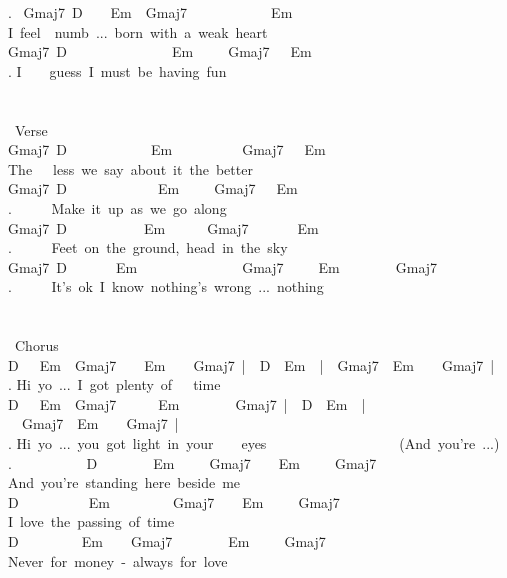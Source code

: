 {. \ Gmaj7\ D\ \ \ \ Em\ \ Gmaj7\ \ \ \ \ \ \ \ \ \ \ \ Em\\
I\ feel\ \ numb\ ...\ born\ with\ a\ weak\ heart\\
Gmaj7\ D\ \ \ \ \ \ \ \ \ \ \ \ \ \ \ Em\ \ \ \ \ Gmaj7\ \ \ Em\\
. I\ \ \ \ guess\ I\ must\ be\ having\ fun\\
\\
\\
\lbrack\ Verse\rbrack\\
Gmaj7\ D\ \ \ \ \ \ \ \ \ \ \ \ Em\ \ \ \ \ \ \ \ \ \ Gmaj7\ \ \ Em\\
The\ \ \ less\ we\ say\ about\ it\ the\ better\\
Gmaj7\ D\ \ \ \ \ \ \ \ \ \ \ \ \ Em\ \ \ \ \ Gmaj7\ \ \ Em\\
. \ \ \ \ \ Make\ it\ up\ as\ we\ go\ along\\
Gmaj7\ D\ \ \ \ \ \ \ \ \ \ \ Em\ \ \ \ \ \ Gmaj7\ \ \ \ \ \ \ Em\\
. \ \ \ \ \ Feet\ on\ the\ ground,\ head\ in\ the\ sky\\
Gmaj7\ D\ \ \ \ \ \ \ Em\ \ \ \ \ \ \ \ \ \ \ \ \ \ \ Gmaj7\ \ \ \ \ Em\ \ \ \ \ \ \ \ Gmaj7\\
. \ \ \ \ \ It's\ ok\ I\ know\ nothing's\ wrong\ ...\ nothing\\
\\
\\
\lbrack\ Chorus\rbrack\\
D\ \ \ Em\ \ Gmaj7\ \ \ \ Em\ \ \ \ Gmaj7\ |\ \ D\ \ Em\ \ |\ \ Gmaj7\ \ Em\ \ \ \ Gmaj7\ |\\
. Hi\ yo\ ...\ I\ got\ plenty\ of\ \ \ time\\
D\ \ \ Em\ \ Gmaj7\ \ \ \ \ \ Em\ \ \ \ \ \ \ \ Gmaj7\ |\ \ D\ \ Em\ \ |\ \ Gmaj7\ \ Em\ \ \ \ Gmaj7\ |\\
. Hi\ yo\ ...\ you\ got\ light\ in\ your\ \ \ \ eyes\ \ \ \ \ \ \ \ \ \ \ \ \ \ \ \ \ \ \ (And\ you're\ ...)\\
. \ \ \ \ \ \ \ \ \ \ D\ \ \ \ \ \ \ \ Em\ \ \ \ \ Gmaj7\ \ \ \ Em\ \ \ \ \ Gmaj7\\
And\ you're\ standing\ here\ beside\ me\\
D\ \ \ \ \ \ \ \ \ \ Em\ \ \ \ \ \ \ \ \ Gmaj7\ \ \ \ Em\ \ \ \ \ Gmaj7\\
I\ love\ the\ passing\ of\ time\\
D\ \ \ \ \ \ \ \ \ Em\ \ \ \ Gmaj7\ \ \ \ \ \ \ \ Em\ \ \ \ \ Gmaj7\\
Never\ for\ money\ -\ always\ for\ love\\
}
